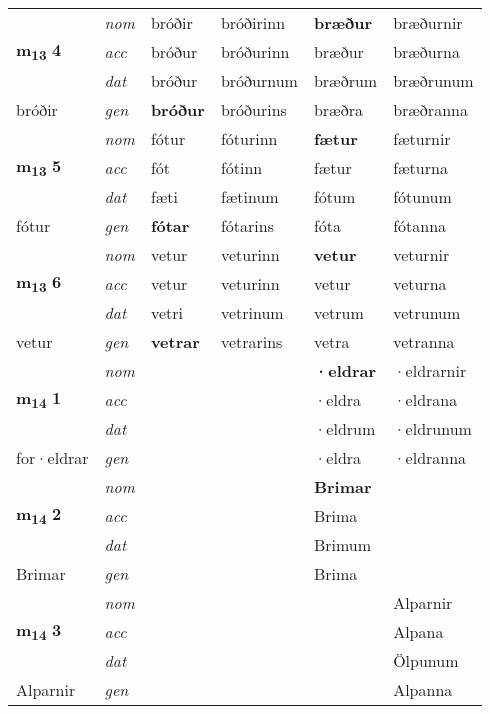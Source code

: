 \begin{longtable}[l]{X>{\footnotesize\itshape}XXXXX}
\multirow{3}{*}{{{\textbf{m{\textsubscript{13}}} \Large{\textbf{4}}}}} & nom & bróðir & bróðirinn & \textbf{bræður} & bræðurnir \\*
 & acc & bróður & bróðurinn & bræður & bræðurna \\*
 & dat & bróður & bróðurnum & bræðrum & bræðrunum \\*
 {\footnotesize{bróðir}} & gen & \textbf{bróður} & bróðurins & bræðra & bræðranna \\
\cmidrule{1-6}

\multirow{3}{*}{{{\textbf{m{\textsubscript{13}}} \Large{\textbf{5}}}}} & nom & fótur & fóturinn & \textbf{fætur} & fæturnir \\*
 & acc & fót & fótinn & fætur & fæturna \\*
 & dat & fæti & fætinum & fótum & fótunum \\*
 {\footnotesize{fótur}} & gen & \textbf{fótar} & fótarins & fóta & fótanna \\
\cmidrule{1-6}

\multirow{3}{*}{{{\textbf{m{\textsubscript{13}}} \Large{\textbf{6}}}}} & nom & vetur & veturinn & \textbf{vetur} & veturnir \\*
 & acc & vetur & veturinn & vetur & veturna \\*
 & dat & vetri & vetrinum & vetrum & vetrunum \\*
 {\footnotesize{vetur}} & gen & \textbf{vetrar} & vetrarins & vetra & vetranna \\
\cmidrule{1-6}

\multirow{3}{*}{{{\textbf{m{\textsubscript{14}}} \Large{\textbf{1}}}}} & nom &  &  & \textbf{·eldrar} & ·eldrarnir \\*
 & acc &  &  & ·eldra & ·eldrana \\*
 & dat &  &  & ·eldrum & ·eldrunum \\*
 {\footnotesize{for\allowbreak ·eldrar}} & gen & \textbf{} &  & ·eldra & ·eldranna \\
\cmidrule{1-6}

\multirow{3}{*}{{{\textbf{m{\textsubscript{14}}} \Large{\textbf{2}}}}} & nom &  &  & \textbf{Brimar} &  \\*
 & acc &  &  & Brima &  \\*
 & dat &  &  & Brimum &  \\*
 {\footnotesize{Brimar}} & gen & \textbf{} &  & Brima &  \\
\cmidrule{1-6}

\multirow{3}{*}{{{\textbf{m{\textsubscript{14}}} \Large{\textbf{3}}}}} & nom &  &  & \textbf{} & Alparnir \\*
 & acc &  &  &  & Alpana \\*
 & dat &  &  &  & Ölpunum \\*
 {\footnotesize{Alparnir}} & gen & \textbf{} &  &  & Alpanna \\
\cmidrule{1-6}


\end{longtable}
